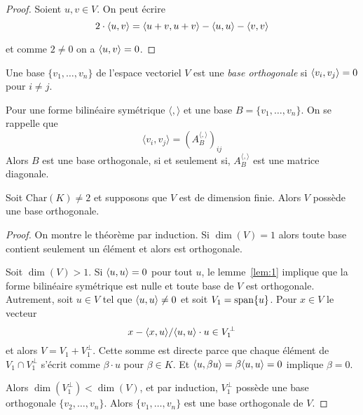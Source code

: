 \begin{proof}
  Soient $u,v \in V$. 
  On peut écrire
  \begin{displaymath}
   2 \cdot  \langle {u,v} \rangle = \langle {u+v,u+v} \rangle - \langle {u,u} \rangle - \langle {v,v} \rangle 
  \end{displaymath}

et comme $2 \neq 0$ on a $\langle {u,v} \rangle = 0$. 
\end{proof}


\begin{definition}
  \label{def:38}
  Une base $\{v_1,\dots,v_n\}$
  de l'espace vectoriel $V$
  est une \emph{base orthogonale} si $\langle {v_i,v_j} \rangle=0$
  pour $i\neq j$.
\end{definition}



\begin{remark}
  \label{rem:7}
  Pour une forme bilinéaire symétrique $\langle , \rangle$ et une base $B = \{v_1,\dots,v_n\}$. On se rappelle que 
  \begin{displaymath}
    〈v_i,v_j〉 = (A_B^{〈, 〉})_{ij}
  \end{displaymath}
  Alors $B$ est une base orthogonale, si et seulement si, $A_B^{\langle , \rangle}$ est une matrice diagonale.  
\end{remark}


\begin{theorem}
  \label{thr:5}
  Soit $\mathrm{Char}(K)\neq 2$
  et supposons que $V$
  est de dimension finie. Alors $V$ possède une base orthogonale.
\end{theorem}


\begin{proof}
  On montre le théorème par induction. Si $\dim(V) = 1$ alors toute base contient seulement un élément et alors est orthogonale. 

Soit $\dim(V) >1$.  Si $\langle {u,u} \rangle = 0$ pour tout $u$, le lemme~\ref{lem:1} implique que la forme bilinéaire symétrique est nulle et toute base de $V$  est orthogonale.  
Autrement, soit $u \in V$ tel que $\langle {u,u} \rangle \neq 0$ et soit $V_1 = \operatorname{span}\{u\}$. Pour  $x \in V$ le vecteur 
\begin{displaymath}
  x - \langle {x,u} \rangle/\langle {u,u} \rangle \cdot  u \in V_1^\perp
\end{displaymath}
et alors $V = V_1 + V_1^\perp$. Cette somme est directe parce que chaque élément de $V_1 \cap V_1^\perp$ s'écrit comme $\beta \cdot u$ pour $\beta \in K$. Et $\langle {u,\beta u} \rangle = \beta \langle {u,u} \rangle = 0$ implique $\beta = 0$. 

Alors $\dim(V_1^\perp) < \dim(V)$, et par induction, $V_1^\perp$ possède une base orthogonale $\{v_2,\dots,v_n\}$. Alors $\{v_1,\dots,v_n\}$ est une base orthogonale de $V$. 
\end{proof}  



